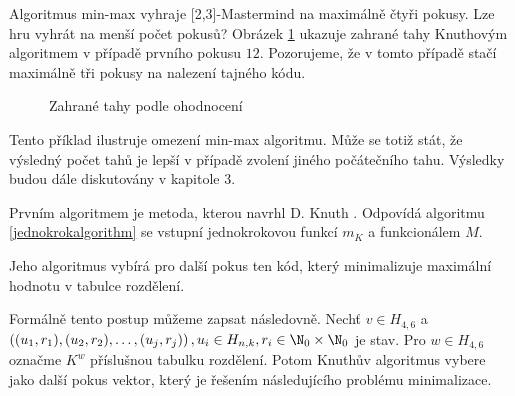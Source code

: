 \begin{prikl}
    Algoritmus min-max vyhraje [2,3]-Mastermind na maximálně čtyři pokusy. Lze hru vyhrát na menší počet pokusů? Obrázek \ref{fig23start12} ukazuje zahrané tahy Knuthovým algoritmem v případě prvního pokusu $12$. Pozorujeme, že v tomto případě stačí maximálně tři pokusy na nalezení tajného kódu. 

    
\begin{figure}[h!]
    \centering
    \caption{Zahrané tahy podle ohodnocení}
    \label{fig23start12}
    \end{figure}

\end{prikl}

Tento příklad ilustruje omezení min-max algoritmu. Může se totiž stát, že výsledný počet tahů je lepší v případě zvolení jiného počátečního tahu. Výsledky budou dále diskutovány v kapitole $3$.


Prvním algoritmem je metoda, kterou navrhl D. Knuth \cite{donald_e__knuth_1977}. Odpovídá algoritmu \ref{jednokrokalgorithm} se vstupní jednokrokovou funkcí $m_K$ a funkcionálem $M$.

Jeho algoritmus vybírá pro další pokus ten kód, který minimalizuje maximální hodnotu v tabulce rozdělení. 

Formálně tento postup můžeme zapsat následovně. Nechť $v\in H_{4,6}$ a \hfill \break $\left((u_1, r_1), (u_2,r_2), \dots, (u_j,r_j)\right), u_i \in H_{n,k}, r_i \in \N _0 \times \N _0$ je stav. Pro $w \in H_{4,6}$ označme $K^w$ příslušnou tabulku rozdělení. Potom Knuthův algoritmus vybere jako další pokus vektor, který je řešením následujícího problému minimalizace.

